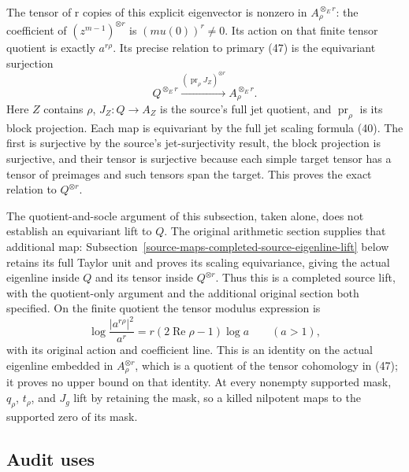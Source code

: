 The tensor of r copies of this explicit eigenvector is nonzero in \(A_\rho^{\otimes_E r}\): the coefficient of \((z^{m-1})^{\otimes r}\) is \((m u(0))^r\ne0\). Its action on that finite tensor quotient is exactly \(a^{r\rho}\). Its precise relation to primary (47) is the equivariant surjection \[
Q^{\otimes_E r}\xrightarrow{(\operatorname{pr}_\rho J_Z)^{\otimes r}}
A_\rho^{\otimes_E r}.
\] Here \(Z\) contains \(\rho\), \(J_Z:Q\to A_Z\) is the source's full jet quotient, and \(\operatorname{pr}_\rho\) is its block projection. Each map is equivariant by the full jet scaling formula (40). The first is surjective by the source's jet-surjectivity result, the block projection is surjective, and their tensor is surjective because each simple target tensor has a tensor of preimages and such tensors span the target. This proves the exact relation to \(Q^{\otimes r}\).

The quotient-and-socle argument of this subsection, taken alone, does not establish an equivariant lift to \(Q\). The original arithmetic section supplies that additional map: Subsection~\ref{source-maps-completed-source-eigenline-lift} below retains its full Taylor unit and proves its scaling equivariance, giving the actual eigenline inside \(Q\) and its tensor inside \(Q^{\otimes r}\). Thus this is a completed source lift, with the quotient-only argument and the additional original section both specified. On the finite quotient the tensor modulus expression is \[
\log\frac{|a^{r\rho}|^2}{a^r}=r(2\operatorname{Re}\rho-1)\log a
\qquad(a>1),
\] with its original action and coefficient line. This is an identity on the actual eigenline embedded in \(A_\rho^{\otimes r}\), which is a quotient of the tensor cohomology in (47); it proves no upper bound on that identity. At every nonempty supported mask, \(q_\rho\), \(t_\rho\), and \(J_g\) lift by retaining the mask, so a killed nilpotent maps to the supported zero of its mask.

\subsection{Audit uses}\label{source-maps-audit-uses}

